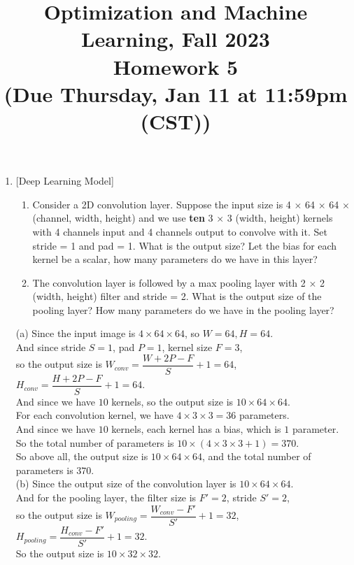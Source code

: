 \documentclass[10pt]{article}
\begin{document}
\date{}
\title{Optimization and Machine Learning, Fall 2023 \\
	Homework 5 \\
	\small (Due Thursday, Jan 11 at 11:59pm (CST))}
\maketitle
\begin{enumerate}[1.]

	\item {} [Deep Learning Model]
	\begin{enumerate}
		\item Consider a 2D convolution layer. Suppose the input size is 4 $\times$ 64 $\times$ 64 $\times$ (channel, width, height) and
		we use \textbf{ten} 3 $\times$ 3 (width, height) kernels with 4 channels input and 4 channels output to convolve with it. Set stride = 1 and pad = 1. What is 
		the output size? Let the bias for each kernel be a scalar, how many parameters do we have in this layer? 
		\item The convolution layer is followed by a max pooling layer with 2 × 2 (width, height) filter and stride
		= 2. What is the output size of the pooling layer? How many parameters do we have in the pooling
		layer? 
	\end{enumerate}
	
(a) Since the input image is $4\times 64\times 64$, so $W=64,H=64$.\\
And since stride $S=1$, pad $P=1$, kernel size $F=3$,\\
so the output size is $W_{conv}=\dfrac{W+2P-F}{S}+1=64$, $H_{conv}=\dfrac{H+2P-F}{S}+1=64$.\\
And since we have $10$ kernels, so the output size is $10\times 64\times 64$.\\

For each convolution kernel, we have $4\times 3\times 3=36$ parameters.\\
And since we have $10$ kernels, each kernel has a bias, which is $1$ parameter.\\
So the total number of parameters is $10\times (4\times 3\times 3+1)=370$.\\

So above all, the output size is $10\times 64\times 64$, and the total number of parameters is $370$.\\

(b) Since the output size of the convolution layer is $10\times 64\times 64$.\\
And for the pooling layer, the filter size is $F' = 2$, stride $S'=2$,\\
so the output size is $W_{pooling}=\dfrac{W_{conv}-F'}{S'}+1=32$, $H_{pooling}=\dfrac{H_{conv}-F'}{S'}+1=32$.\\
So the output size is $10\times 32\times 32$.\\


\end{enumerate}
\end{document}
